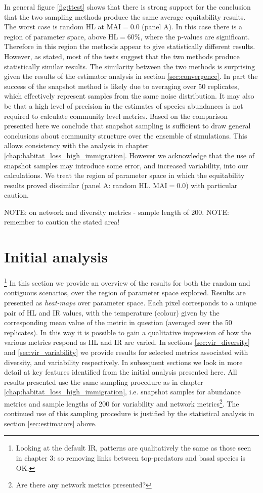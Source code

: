 In general figure \ref{fig:ttest} shows that there is strong support for the conclusion that the two sampling methods produce the same average equitability results. The worst case is random HL at MAI$=0.0$ (panel A). In this case there is a region of parameter space, above HL$=60\%$, where the p-values are significant. Therefore in this region the methods appear to give statistically different results. However, as stated, most of the tests suggest that the two methods produce statistically similar results. The similarity between the two methods is surprising given the results of the estimator analysis in section \ref{sec:convergence}. In part the success of the snapshot method is likely due to averaging over 50 replicates, which effectively represent samples from the same noise distribution. It may also be that a high level of precision in the estimates of species abundances is not required to calculate community level metrics. Based on the comparison presented here we conclude that snapshot sampling is sufficient to draw general conclusions about community structure over the ensemble of simulations. This allows consistency with the analysis in chapter \ref{chap:habitat_loss_high_immigration}. However we acknowledge that the use of snapshot samples may introduce some error, and increased variability, into our calculations. We treat the region of parameter space in which the equitability results proved dissimilar (panel A: random HL. MAI$=0.0$) with particular caution.

NOTE: on network and diversity metrics - sample length of 200.
NOTE: remember to caution the stated area!

\section{Initial analysis}
\label{sec:init_res}
\footnote{Looking at the default IR, patterns are qualitatively the same as those seen in chapter 3: so removing links between top-predators and basal species is OK.}
In this section we provide an overview of the results for both the random and contiguous scenarios, over the region of parameter space explored. Results are presented as \emph{heat-maps} over parameter space. Each pixel corresponds to a unique pair of HL and IR values, with the temperature (colour) given by the corresponding mean value of the metric in question (averaged over the 50 replicates). In this way it is possible to gain a qualitative impression of how the various metrics respond as HL and IR are varied. In sections \ref{sec:vir_diversity} and \ref{sec:vir_variability} we provide results for selected metrics associated with diversity, and variability respectively. In subsequent sections we look in more detail at key features identified from the initial analysis presented here. All results presented use the same sampling procedure as in chapter \ref{chap:habitat_loss_high_immigration}, i.e. snapshot samples for abundance metrics and sample lengths of 200 for variability and network metrics\footnote{Are there any network metrics presented?}.  The continued use of this sampling procedure is justified by the statistical analysis in section \ref{sec:estimators} above.


